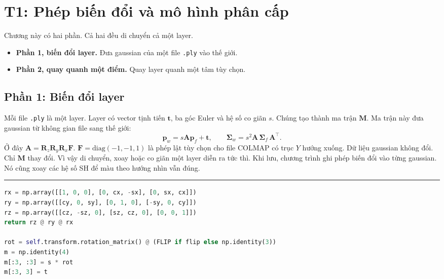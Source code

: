 \documentclass[9pt,twocolumn,a4paper]{extarticle}
\newenvironment{codebox}{\par\vspace{5pt}\noindent\begin{minipage}{\columnwidth}\hrule height 0.8pt\vspace{2pt}}{\end{minipage}\par\vspace{5pt}\noindent\ignorespaces}
\newcommand{\code}[1]{\texttt{#1}}
\newcommand{\Sig}{\symbf{\Sigma}}
\begin{document}
\section{T1: Phép biến đổi và mô hình phân cấp}
\label{chap:t1}
Chương này có hai phần. Cả hai đều di chuyển cả một layer.
\begin{itemize}\itemsep0pt
\item \textbf{Phần 1, biến đổi layer.} Đưa gaussian của một file \code{.ply} vào thế giới.
\item \textbf{Phần 2, quay quanh một điểm.} Quay layer quanh một tâm tùy chọn.
\end{itemize}

\subsection{Phần 1: Biến đổi layer}
\label{sec:layers}
Mỗi file \code{.ply} là một layer. Layer có vector tịnh tiến $\mathbf{t}$, ba góc Euler và hệ số co giãn $s$. Chúng tạo thành ma trận $\mathbf{M}$. Ma trận này đưa gaussian từ không gian file sang thế giới:
\begin{equation}
\mathbf{p}_w=s\mathbf{A}\mathbf{p}_f+\mathbf{t},\qquad
\Sig_w=s^{2}\mathbf{A}\,\Sig_f\,\mathbf{A}^{\top}.
\label{eq:world}
\end{equation}
Ở đây $\mathbf{A}=\mathbf{R}_z\mathbf{R}_y\mathbf{R}_x\mathbf{F}$. $\mathbf{F}=\mathrm{diag}(-1,-1,1)$ là phép lật tùy chọn cho file COLMAP có trục $Y$ hướng xuống. Dữ liệu gaussian không đổi. Chỉ $\mathbf{M}$ thay đổi. Vì vậy di chuyển, xoay hoặc co giãn một layer diễn ra tức thì. Khi lưu, chương trình ghi phép biến đổi vào từng gaussian. Nó cũng xoay các hệ số SH để màu theo hướng nhìn vẫn đúng.

\begin{codebox}
\begin{lstlisting}[language=Python,caption={\code{core/math3d.py} và \code{core/layer.py}: ma trận $\mathbf{M}$ của layer},label={lst:world}]
rx = np.array([[1, 0, 0], [0, cx, -sx], [0, sx, cx]])
ry = np.array([[cy, 0, sy], [0, 1, 0], [-sy, 0, cy]])
rz = np.array([[cz, -sz, 0], [sz, cz, 0], [0, 0, 1]])
return rz @ ry @ rx

rot = self.transform.rotation_matrix() @ (FLIP if flip else np.identity(3))
m = np.identity(4)
m[:3, :3] = s * rot
m[:3, 3] = t
\end{lstlisting}
\end{codebox}
\end{document}
